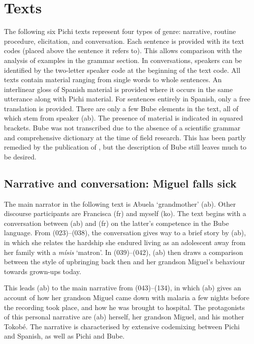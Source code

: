 \chapter{Texts}

The following six Pichi texts represent four types of genre: narrative, routine procedure, elicitation, and conversation. Each sentence is provided with its text codes (placed above the sentence it refers to). This allows comparison with the analysis of examples in the grammar section. In conversations, speakers can be identified by the two-letter speaker code at the beginning of the text code. All texts contain  material ranging from single words to whole sentences. An interlinear gloss of Spanish material is provided where it occurs in the same utterance along with Pichi material. For sentences entirely in Spanish, only a free translation is provided. There are only a few Bube elements in the text, all of which stem from speaker (ab). The presence of  material is indicated in squared brackets. Bube was not transcribed due to the absence of a scientific grammar and comprehensive dictionary at the time of field research. This has been partly remedied by the publication of \citet{Bolekia2009}, but the description of Bube still leaves much to be desired.

\section{Narrative and conversation: Miguel falls sick}

\largerpage
The main narrator in the following text is Abuela ‘grandmother’ (ab). Other discourse participants are Francisca (fr) and myself (ko). The text begins with a conversation between (ab) and (fr) on the latter’s competence in the Bube language. From (023)–(038), the conversation gives way to a brief story by (ab), in which she relates the hardship she endured living as an adolescent away from her family with a \textit{mísis} ‘matron’. In (039)–(042), (ab) then draws a comparison between the style of upbringing back then and her grandson Miguel’s behaviour towards grown-ups today. 


This leads (ab) to the main narrative from (043)–(134), in which (ab) gives an account of how her grandson Miguel came down with malaria a few nights before the recording took place, and how he was brought to hospital. The protagonists of this personal narrative are (ab) herself, her grandson Miguel, and his mother Tokobé. The narrative is characterised by extensive codemixing between Pichi and Spanish, as well as Pichi and Bube. 

